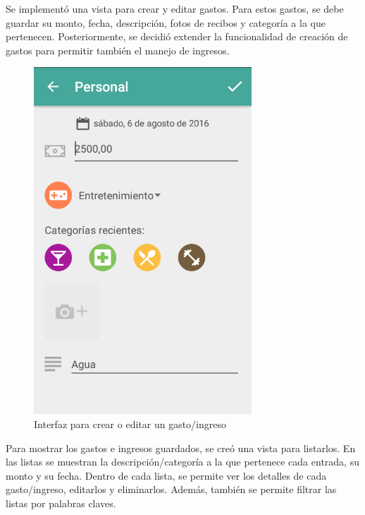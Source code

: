 Se implementó una vista para crear y editar gastos. Para estos gastos, se debe guardar su monto, fecha, descripción, fotos de recibos y categoría a la que pertenecen. Posteriormente, se decidió extender la funcionalidad de creación de gastos para permitir también el manejo de ingresos. 

\begin{figure}[ht]
  \centering
  \includegraphics[scale=0.45,type=png,ext=.png,read=.png]{imagenes/create_entry}
  \caption{Interfaz para crear o editar un gasto/ingreso}
  \label{fig:interfazCrearEntry}
\end{figure}

Para mostrar los gastos e ingresos guardados, se creó una vista para listarlos. En las listas se muestran la descripción/categoría a la que pertenece cada entrada, su monto y su fecha. Dentro de cada lista, se permite ver los detalles de cada gasto/ingreso, editarlos y eliminarlos. Además, también se permite filtrar las listas por palabras claves.

